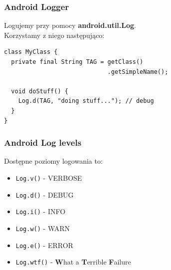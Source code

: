 % 
% 
% 
% 
% 
% 
% 


\begin{frame}[fragile]\frametitle{Android Logger}
Logujemy przy pomocy \textbf{android.util.Log}.\\
Korzystamy z niego następująco:

\begin{lstlisting}
class MyClass {
  private final String TAG = getClass()
                             .getSimpleName();

  void doStuff() {
    Log.d(TAG, "doing stuff..."); // debug
  }
}
\end{lstlisting}
\end{frame}

\begin{frame}[fragile]\frametitle{Android Log levels}
Dostępne poziomy logowania to:
\begin{itemize}
 \item \verb|Log.v()| - VERBOSE
 \item \verb|Log.d()| - DEBUG
 \pause \item \verb|Log.i()| - INFO
 \pause \item \verb|Log.w()| - WARN
 \pause \item \verb|Log.e()| - ERROR
 \pause \item \verb|Log.wtf()| \pause - \textbf{W}hat a \textbf{T}errible \textbf{F}ailure
\end{itemize}

\end{frame}


